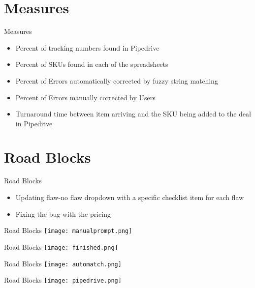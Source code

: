 \documentclass[aspectratio=1610]{beamer}
\begin{document}
\section{Measures}
\begin{frame}{Measures}
    \begin{itemize}
        \item Percent of tracking numbers found in Pipedrive 
        \item Percent of SKUs found in each of the spreadsheets
        \item Percent of Errors automatically corrected by fuzzy string matching
        \item Percent of Errors manually corrected by Users
        \item Turnaround time between item arriving and the SKU being added to the deal in Pipedrive
    \end{itemize}
\end{frame}
\section{Road Blocks}
\begin{frame}{Road Blocks}
    \begin{itemize}
        \item Updating flaw-no flaw dropdown with a specific checklist item for each flaw
        \item Fixing the bug with the pricing
    \end{itemize}
\end{frame}
\begin{frame}{Road Blocks}
    \texttt{[image: manualprompt.png]}
\end{frame}
\begin{frame}{Road Blocks}
    \texttt{[image: finished.png]}
\end{frame}
\begin{frame}{Road Blocks}
    \texttt{[image: automatch.png]}
\end{frame}
\begin{frame}{Road Blocks}
    \texttt{[image: pipedrive.png]}
\end{frame} 
\end{document}
